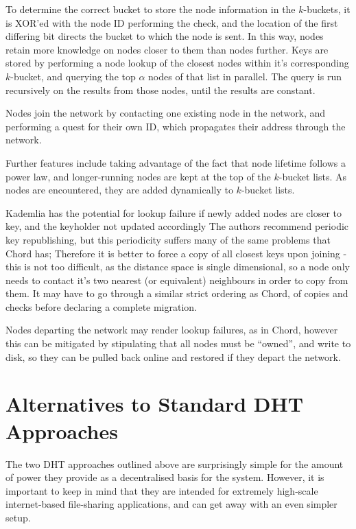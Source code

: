 \documentclass[10pt, a4paper]{article}
\begin{document}
To determine the correct bucket to store the node information in the $k$-buckets, it is XOR'ed with the node ID performing the check, and the location of the first differing bit directs the bucket to which the node is sent.
In this way, nodes retain more knowledge on nodes closer to them than nodes further.
Keys are stored by performing a node lookup of the closest nodes within it's corresponding $k$-bucket, and querying the top $\alpha$ nodes of that list in parallel.
The query is run recursively on the results from those nodes, until the results are constant.

Nodes join the network by contacting one existing node in the network, and performing a quest for their own ID, which propagates their address through the network.

Further features include taking advantage of the fact that node lifetime follows a power law, and longer-running nodes are kept at the top of the $k$-bucket lists.
As nodes are encountered, they are added dynamically to $k$-bucket lists.

Kademlia has the potential for lookup failure if newly added nodes are closer to key, and the keyholder not updated accordingly
The authors recommend periodic key republishing, but this periodicity suffers many of the same problems that Chord has;
Therefore it is better to force a copy of all closest keys upon joining - this is not too difficult, as the distance space is single dimensional, so a node only needs to contact it's two nearest (or equivalent) neighbours in order to copy from them.
It may have to go through a similar strict ordering as Chord, of copies and checks before declaring a complete migration.

Nodes departing the network may render lookup failures, as in Chord, however this can be mitigated by stipulating that all nodes must be ``owned'', and write to disk, so they can be pulled back online and restored if they depart the network.

\section{Alternatives to Standard DHT Approaches}

The two DHT approaches outlined above are surprisingly simple for the amount of power they provide as a decentralised basis for the system.
However, it is important to keep in mind that they are intended for extremely high-scale internet-based file-sharing applications, and \lsr{} can get away with an even simpler setup.
\end{document}

